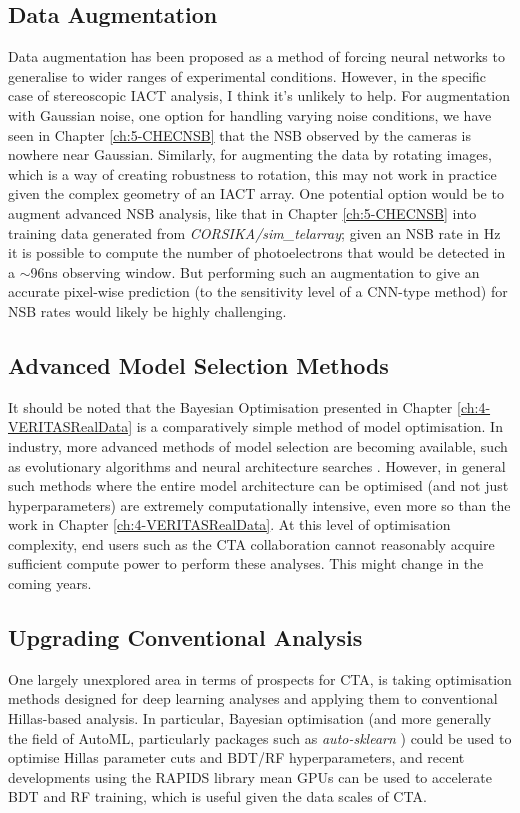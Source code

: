 \subsection{Data Augmentation}
Data augmentation has been proposed \cite{aug} as a method of forcing neural networks to generalise to wider ranges of experimental conditions. However, in the specific case of stereoscopic IACT analysis, I think it's unlikely to help. For augmentation with Gaussian noise, one option for handling varying noise conditions, we have seen in Chapter \ref{ch:5-CHECNSB} that the NSB observed by the cameras is nowhere near Gaussian. Similarly, for augmenting the data by rotating images, which is a way of creating robustness to rotation, this may not work in practice given the complex geometry of an IACT array. One potential option would be to augment advanced NSB analysis, like that in Chapter \ref{ch:5-CHECNSB} into training data generated from \textit{CORSIKA/sim\_telarray}; given an NSB rate in Hz it is possible to compute the number of photoelectrons that would be detected in a $\sim$96ns observing window. But performing such an augmentation to give an accurate pixel-wise prediction (to the sensitivity level of a CNN-type method) for NSB rates would likely be highly challenging.

\subsection{Advanced Model Selection Methods}

It should be noted that the Bayesian Optimisation presented in Chapter \ref{ch:4-VERITASRealData} is a comparatively simple method of model optimisation. In industry, more advanced methods of model selection are becoming available, such as evolutionary algorithms \cite{evodeep} and neural architecture searches \cite{neural}. However, in general such methods where the entire model architecture can be optimised (and not just hyperparameters) are extremely computationally intensive, even more so than the work in Chapter \ref{ch:4-VERITASRealData}. At this level of optimisation complexity, end users such as the CTA collaboration cannot reasonably acquire sufficient compute power to perform these analyses. This might change in the coming years.

\subsection{Upgrading Conventional Analysis}
One largely unexplored area in terms of prospects for CTA, is taking optimisation methods designed for deep learning analyses and applying them to conventional Hillas-based analysis. In particular, Bayesian optimisation (and more generally the field of AutoML, particularly packages such as \textit{auto-sklearn} \cite{autosklearn}) could be used to optimise Hillas parameter cuts and BDT/RF hyperparameters, and recent developments using the RAPIDS \cite{rapids} library mean GPUs can be used to accelerate BDT and RF training, which is useful given the data scales of CTA.


